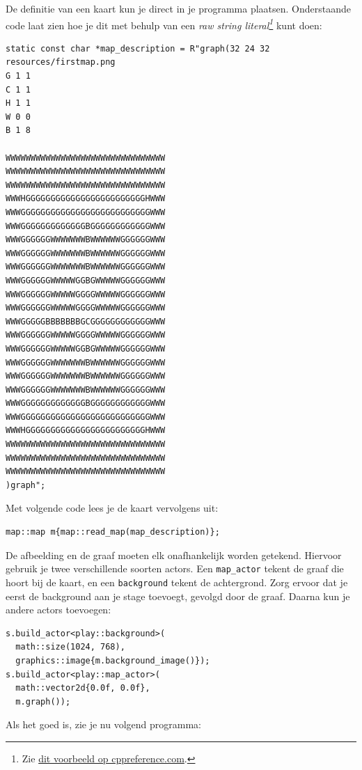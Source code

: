 \documentclass[11pt]{article}
\begin{document}
De definitie van een kaart kun je direct in je programma
plaatsen. Onderstaande code laat zien hoe je dit met behulp van een \emph{raw
string literal\footnote{Zie \href{https://en.cppreference.com/w/cpp/language/string\_literal}{dit voorbeeld op cppreference.com}.}} kunt doen:
\begin{verbatim}
static const char *map_description = R"graph(32 24 32
resources/firstmap.png
G 1 1
C 1 1
H 1 1
W 0 0
B 1 8

WWWWWWWWWWWWWWWWWWWWWWWWWWWWWWWW
WWWWWWWWWWWWWWWWWWWWWWWWWWWWWWWW
WWWWWWWWWWWWWWWWWWWWWWWWWWWWWWWW
WWWHGGGGGGGGGGGGGGGGGGGGGGGGHWWW
WWWGGGGGGGGGGGGGGGGGGGGGGGGGGWWW
WWWGGGGGGGGGGGGGBGGGGGGGGGGGGWWW
WWWGGGGGGWWWWWWWBWWWWWWGGGGGGWWW
WWWGGGGGGWWWWWWWBWWWWWWGGGGGGWWW
WWWGGGGGGWWWWWWWBWWWWWWGGGGGGWWW
WWWGGGGGGWWWWWGGBGWWWWWGGGGGGWWW
WWWGGGGGGWWWWWGGGGWWWWWGGGGGGWWW
WWWGGGGGGWWWWWGGGGWWWWWGGGGGGWWW
WWWGGGGGBBBBBBBGCGGGGGGGGGGGGWWW
WWWGGGGGGWWWWWGGGGWWWWWGGGGGGWWW
WWWGGGGGGWWWWWGGBGWWWWWGGGGGGWWW
WWWGGGGGGWWWWWWWBWWWWWWGGGGGGWWW
WWWGGGGGGWWWWWWWBWWWWWWGGGGGGWWW
WWWGGGGGGWWWWWWWBWWWWWWGGGGGGWWW
WWWGGGGGGGGGGGGGBGGGGGGGGGGGGWWW
WWWGGGGGGGGGGGGGGGGGGGGGGGGGGWWW
WWWHGGGGGGGGGGGGGGGGGGGGGGGGHWWW
WWWWWWWWWWWWWWWWWWWWWWWWWWWWWWWW
WWWWWWWWWWWWWWWWWWWWWWWWWWWWWWWW
WWWWWWWWWWWWWWWWWWWWWWWWWWWWWWWW
)graph";
\end{verbatim}

Met volgende code lees je de kaart vervolgens uit:
\begin{verbatim}
map::map m{map::read_map(map_description)};
\end{verbatim}

De afbeelding en de graaf moeten elk onafhankelijk worden
getekend. Hiervoor gebruik je twee verschillende soorten actors. Een
\texttt{map\_actor} tekent de graaf die hoort bij de kaart, en een \texttt{background}
tekent de achtergrond. Zorg ervoor dat je eerst de background aan je stage
toevoegt, gevolgd door de graaf. Daarna kun je andere actors toevoegen:
\begin{verbatim}
s.build_actor<play::background>(
  math::size(1024, 768),
  graphics::image{m.background_image()});
s.build_actor<play::map_actor>(
  math::vector2d{0.0f, 0.0f},
  m.graph());
\end{verbatim}

Als het goed is, zie je nu volgend programma:
\end{document}
